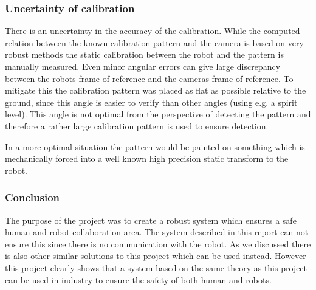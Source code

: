  

\subsubsection{Uncertainty of calibration}
There is an uncertainty in the accuracy of the calibration. While the computed relation between the known calibration pattern and the camera is based on very robust methods the static calibration between the robot and the pattern is manually measured. Even minor angular errors can give large discrepancy between the robots frame of reference and the cameras frame of reference. To mitigate this the calibration pattern was placed as flat as possible relative to the ground, since this angle is easier to verify than other angles (using e.g. a spirit level). This angle is not optimal from the perspective of detecting the pattern and therefore a rather large calibration pattern is used to ensure detection.

In a more optimal situation the pattern would be painted on something which is mechanically forced into a well known high precision static transform to the robot.

\subsubsection{Conclusion}

The purpose of the project was to create a robust system which ensures a safe human and robot collaboration area. The system described in this report can not ensure this since there is no communication with the robot. As we discussed there is also other similar solutions to this project which can be used instead. However this project clearly shows that a system based on the same theory as this project can be used in industry to ensure the safety of both human and robots. 
